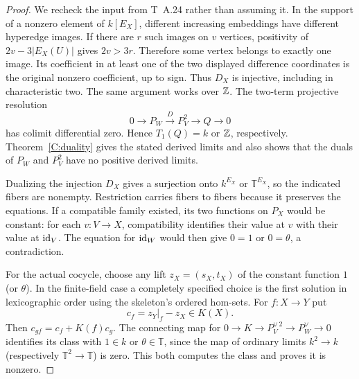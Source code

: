 \begin{proof}
We recheck the input from T~A.24 rather than assuming it. In the support of a nonzero element of $k[E_X]$, different increasing embeddings have different hyperedge images. If there are $r$ such images on $v$ vertices, positivity of $2v-3|E_X(U)|$ gives $2v>3r$. Therefore some vertex belongs to exactly one image. Its coefficient in at least one of the two displayed difference coordinates is the original nonzero coefficient, up to sign. Thus $D_X$ is injective, including in characteristic two. The same argument works over $\mathbb Z$. The two-term projective resolution
\[
 0\longrightarrow P_W\xrightarrow D P_V^2\longrightarrow Q\longrightarrow0
\]
has colimit differential zero. Hence $T_1(Q)=k$ or $\mathbb Z$, respectively. Theorem~\ref{C:duality} gives the stated derived limits and also shows that the duals of $P_W$ and $P_V^2$ have no positive derived limits.

Dualizing the injection $D_X$ gives a surjection onto $k^{E_X}$ or $\mathbb T^{E_X}$, so the indicated fibers are nonempty. Restriction carries fibers to fibers because it preserves the equations. If a compatible family existed, its two functions on $P_X$ would be constant: for each $v:V\to X$, compatibility identifies their value at $v$ with their value at $\mathrm{id}_V$. The equation for $\mathrm{id}_W$ would then give $0=1$ or $0=\theta$, a contradiction.

For the actual cocycle, choose any lift $z_X=(s_X,t_X)$ of the constant function $1$ (or $\theta$). In the finite-field case a completely specified choice is the first solution in lexicographic order using the skeleton's ordered hom-sets. For $f:X\to Y$ put
\[
 c_f=z_Y|_f-z_X\in K(X).
\]
Then $c_{gf}=c_f+K(f)c_g$. The connecting map for
$0\to K\to P_V^{\vee\,2}\to P_W^\vee\to0$
identifies its class with $1\in k$ or $\theta\in\mathbb T$, since the map of ordinary limits $k^2\to k$ (respectively $\mathbb T^2\to\mathbb T$) is zero. This both computes the class and proves it is nonzero.
\end{proof}


